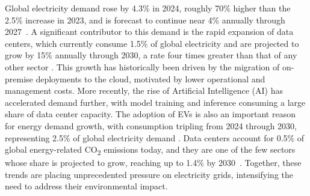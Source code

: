 Global electricity demand rose by 4.3\% in 2024, roughly 70\% higher than the 2.5\% increase in 2023, and is forecast to continue near 4\% annually through 2027~\cite{iea_electricity}.
A significant contributor to this demand is the rapid expansion of data centers, which currently consume 1.5\% of global electricity and are projected to grow by 15\% annually through 2030, a rate four times greater than that of any other sector \cite{iea_demand_report}.
This growth has historically been driven by the migration of on-premise deployments to the cloud, motivated by lower operational and management costs. More recently, the rise of Artificial Intelligence (AI) has accelerated demand further, with model training and inference consuming a large share of data center capacity.
The adoption of EVs is also an important reason for energy demand growth, with consumption tripling from 2024 through 2030, representing 2.5\% of global electricity demand \cite{iea_ev_report}.
Data centers account for 0.5\% of global energy-related CO\textsubscript{2} emissions today, and they are one of the few sectors whose share is projected to grow, reaching up to 1.4\% by 2030~\cite{iea_demand_report}.
Together, these trends are placing unprecedented pressure on electricity grids, intensifying the need to address their environmental impact.


